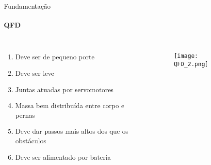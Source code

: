 \begin{frame}[t]{Fundamentação}
    \framesubtitle{QFD}
    \begin{columns}
        \begin{enumerate}
            \item Deve ser de pequeno porte
            \item Deve ser leve
            \item Juntas atuadas por servomotores
            \item Massa bem distribuída entre corpo e pernas
            \item Deve dar passos mais altos dos que os obstáculos
            \item Deve ser alimentado por bateria
        \end{enumerate}
        \begin{figure}
            \texttt{[image: QFD\_2.png]}
        \end{figure}
    \end{columns}

\end{frame}
